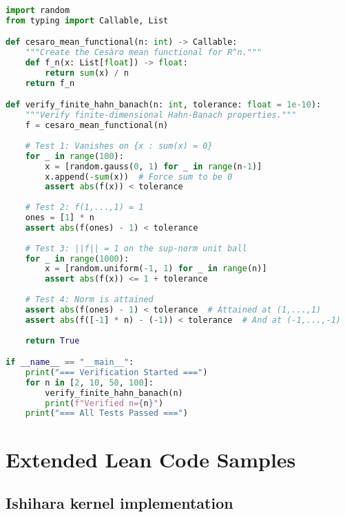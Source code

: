 \documentclass[11pt]{article}  %
\begin{document}
\begin{lstlisting}[language=Python, caption={Finite Hahn--Banach verification}]
import random
from typing import Callable, List

def cesaro_mean_functional(n: int) -> Callable:
    """Create the Cesàro mean functional for R^n."""
    def f_n(x: List[float]) -> float:
        return sum(x) / n
    return f_n

def verify_finite_hahn_banach(n: int, tolerance: float = 1e-10):
    """Verify finite-dimensional Hahn-Banach properties."""
    f = cesaro_mean_functional(n)
    
    # Test 1: Vanishes on {x : sum(x) = 0}
    for _ in range(100):
        x = [random.gauss(0, 1) for _ in range(n-1)]
        x.append(-sum(x))  # Force sum to be 0
        assert abs(f(x)) < tolerance
    
    # Test 2: f(1,...,1) = 1
    ones = [1] * n
    assert abs(f(ones) - 1) < tolerance
    
    # Test 3: ||f|| = 1 on the sup-norm unit ball
    for _ in range(1000):
        x = [random.uniform(-1, 1) for _ in range(n)]
        assert abs(f(x)) <= 1 + tolerance
    
    # Test 4: Norm is attained
    assert abs(f(ones) - 1) < tolerance  # Attained at (1,...,1)
    assert abs(f([-1] * n) - (-1)) < tolerance  # And at (-1,...,-1)
    
    return True

if __name__ == "__main__":
    print("=== Verification Started ===")
    for n in [2, 10, 50, 100]:
        verify_finite_hahn_banach(n)
        print(f"Verified n={n}")
    print("=== All Tests Passed ===")
\end{lstlisting}

\section{Extended Lean Code Samples}

\subsection{Ishihara kernel implementation}
\end{document}
